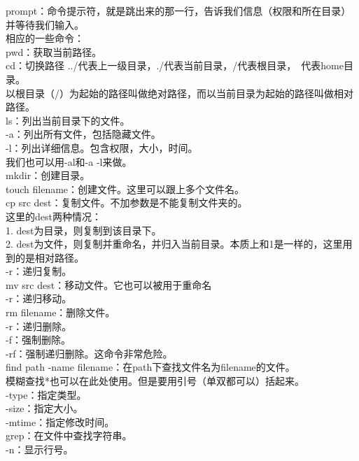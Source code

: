\documentclass{article}
\begin{document}
\noindent
prompt：命令提示符，就是跳出来的那一行，告诉我们信息（权限和所在目录）并等待我们输入。\\

\noindent
相应的一些命令：\\
pwd：获取当前路径。\\
cd：切换路径 ../代表上一级目录，./代表当前目录，/代表根目录，~代表home目录。\\
以根目录（/）为起始的路径叫做绝对路径，而以当前目录为起始的路径叫做相对路径。\\

\noindent
ls：列出当前目录下的文件。\\
\hspace*{2em} -a：列出所有文件，包括隐藏文件。\\
\hspace*{2em} -l：列出详细信息。包含权限，大小，时间。\\
\hspace*{2em} 我们也可以用-al和-a -l来做。\\

\noindent
mkdir：创建目录。\\
touch filename：创建文件。这里可以跟上多个文件名。\\

\noindent
cp src dest：复制文件。不加参数是不能复制文件夹的。\\
这里的dest两种情况：\\
1. dest为目录，则复制到该目录下。\\
2. dest为文件，则复制并重命名，并归入当前目录。本质上和1是一样的，这里用到的是相对路径。\\
\hspace*{2em} -r：递归复制。\\

\noindent
mv src dest：移动文件。它也可以被用于重命名\\
\hspace*{2em} -r：递归移动。\\

\noindent
rm filename：删除文件。\\
\hspace*{2em} -r：递归删除。\\
\hspace*{2em} -f：强制删除。\\
\hspace*{2em} -rf：强制递归删除。这命令非常危险。\\

\noindent
find path -name filename：在path下查找文件名为filename的文件。\\
\hspace*{2em} 模糊查找*也可以在此处使用。但是要用引号（单双都可以）括起来。\\
\hspace*{2em} -type：指定类型。\\
\hspace*{2em} -size：指定大小。\\
\hspace*{2em} -mtime：指定修改时间。\\
grep：在文件中查找字符串。\\
\hspace*{2em} -n：显示行号。\\
\end{document}
